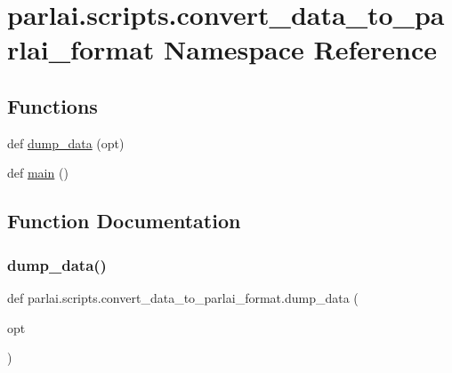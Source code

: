 \hypertarget{namespaceparlai_1_1scripts_1_1convert__data__to__parlai__format}{}\section{parlai.\+scripts.\+convert\+\_\+data\+\_\+to\+\_\+parlai\+\_\+format Namespace Reference}
\label{namespaceparlai_1_1scripts_1_1convert__data__to__parlai__format}
\subsection*{Functions}
\begin{DoxyCompactItemize}
\item 
def \hyperlink{namespaceparlai_1_1scripts_1_1convert__data__to__parlai__format_a4ed2278a6a86b341d814edbef295124c}{dump\+\_\+data} (opt)
\item 
def \hyperlink{namespaceparlai_1_1scripts_1_1convert__data__to__parlai__format_a1cdf007fb0ed5951c0dfb135500d47cd}{main} ()
\end{DoxyCompactItemize}


\subsection{Function Documentation}
\mbox{\label{namespaceparlai_1_1scripts_1_1convert__data__to__parlai__format_a4ed2278a6a86b341d814edbef295124c}} 
\subsubsection{\texorpdfstring{dump\+\_\+data()}{dump\_data()}}
{\footnotesize\ttfamily def parlai.\+scripts.\+convert\+\_\+data\+\_\+to\+\_\+parlai\+\_\+format.\+dump\+\_\+data (\begin{DoxyParamCaption}\item[{}]{opt }\end{DoxyParamCaption})}



